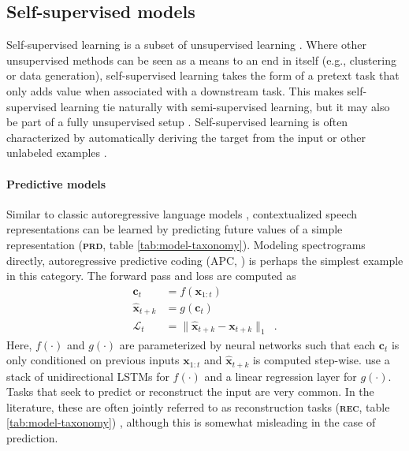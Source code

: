 \subsection{Self-supervised models}
\label{sec:ssmodels}

Self-supervised learning is a subset of unsupervised learning \cite{tsai2020self}. Where other unsupervised methods can be seen as a means to an end in itself (e.g., clustering or data generation), self-supervised learning takes the form of a pretext task that only adds value when associated with a downstream task. This makes self-supervised learning tie naturally with semi-supervised learning, but it may also be part of a fully unsupervised setup \cite{baevski2021unsupervised}. Self-supervised learning is often characterized by automatically deriving the target from the input or other unlabeled examples \cite{ouali2020overview}.


\paragraph{Predictive models} Similar to classic autoregressive language models \cite{mikolov2010recurrent}, contextualized speech representations can be learned by predicting future values of a simple representation \cite{oord2018representation, chung2019unsupervised, schneider2019wav2vec, chung2020generative, jiang2021further} (\textbf{\textsc{prd}}, table \ref{tab:model-taxonomy}). Modeling spectrograms directly, autoregressive predictive coding (APC, \citealp{chung2019unsupervised}) is perhaps the simplest example in this category. The forward pass and loss are computed as
\begin{align}
    \mathbf{c}_{t} &= f(\mathbf{x}_{1:t})  \label{eq:apc_f} \\ 
    \hat{\mathbf{x}}_{t+k} &= g(\mathbf{c}_{t}) \\
    \mathcal{L}_t &= \lVert \hat{\mathbf{x}}_{t+k} - \mathbf{x}_{t+k} \rVert_1\enspace.
\end{align}
%
\noindent Here, $f(\cdot)$ and $g(\cdot)$ are parameterized by neural networks such that each $\mathbf{c}_t$ is only conditioned on previous inputs $\mathbf{x}_{1:t}$ and $\hat{\mathbf{x}}_{t+k}$ is computed step-wise. \citet{chung2019unsupervised} use a stack of unidirectional LSTMs for $f(\cdot)$ and a linear regression layer for $g(\cdot)$. Tasks that seek to predict or reconstruct the input are very common. In the literature, these are often jointly referred to as reconstruction tasks (\textbf{\textsc{rec}}, table \ref{tab:model-taxonomy}) \cite{liu2021tera, wang2021unispeech}, although this is somewhat misleading in the case of prediction.

